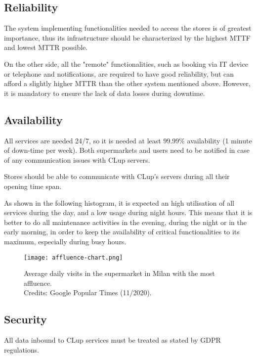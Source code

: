 \documentclass[../../main.tex]{subfiles}
\begin{document}
	\subsection{Reliability}

	The system implementing functionalities needed to access the stores is of greatest importance, thus its 
	infrastructure should be characterized by the highest MTTF and lowest MTTR possible.

	On the other side, all the "remote" functionalities, such as booking via IT device or telephone and notifications, 
	are required to have good reliability, but can afford a slightly higher MTTR than the other system mentioned above. 
	However, it is mandatory to ensure the lack of data losses during downtime.

	\subsection{Availability}

	All services are needed 24/7, so it is needed at least 99.99\% availability (1 minute of down-time per week). 
	Both supermarkets and users need to be notified in case of any communication issues with CLup servers.

	Stores should be able to communicate with CLup's servers during all their opening time span.

	As shown in the following histogram, it is expected an high utilisation of all services during the day, 
	and a low usage during night hours. This means that it is better to do all maintenance activities in the evening, 
	during the night or in the early morning, in order to keep the availability of critical functionalities to its maximum, 
	especially during busy hours.

	\begin{figure}[H]
	    \centering
	    \texttt{[image: affluence-chart.png]}
	    \caption{Average daily visits in the supermarket in Milan with the most affluence. \\Credits: Google Popular Times (11/2020).}
  	\end{figure}

	\subsection{Security}

	All data inbound to CLup services must be treated as stated by GDPR regulations. 
\end{document}
